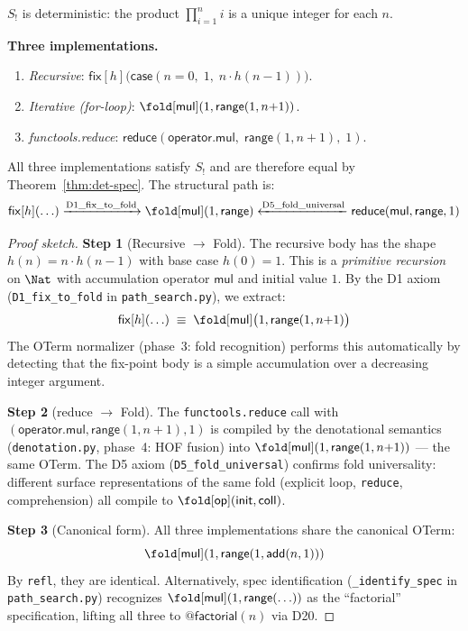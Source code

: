 \begin{proposition}
$S_{!}$ is deterministic: the product $\prod_{i=1}^{n} i$ is a
unique integer for each $n$.
\end{proposition}

\noindent\textbf{Three implementations.}
\begin{enumerate}
  \item \emph{Recursive}:
    $\mathsf{fix}[h]\bigl(\mathsf{case}(n = 0,\; 1,\;
      n \cdot h(n-1))\bigr)$.
  \item \emph{Iterative (for-loop)}:
    $\fold[\mathsf{mul}](1, \mathsf{range}(1, n{+}1))$.
  \item \emph{functools.reduce}:
    $\mathsf{reduce}(\mathsf{operator.mul},\;
      \mathsf{range}(1, n{+}1),\; 1)$.
\end{enumerate}

\begin{theorem}
\label{thm:factorial-equiv}
All three implementations satisfy $S_{!}$ and are therefore
equal by Theorem~\ref{thm:det-spec}.  The structural path is:
\[
  \mathsf{fix}[h](\ldots) \xrightarrow{\text{D1\_fix\_to\_fold}}
  \fold[\mathsf{mul}](1, \mathsf{range})
  \xleftarrow{\text{D5\_fold\_universal}}
  \mathsf{reduce}(\mathsf{mul}, \mathsf{range}, 1)
\]
\end{theorem}

\begin{proof}[Proof sketch]
\textbf{Step 1} (Recursive $\to$ Fold).  The recursive body has the
shape $h(n) = n \cdot h(n-1)$ with base case $h(0) = 1$.  This is a
\emph{primitive recursion} on $\Nat$ with accumulation operator
$\mathsf{mul}$ and initial value $1$.  By the D1 axiom
(\texttt{D1\_fix\_to\_fold} in \texttt{path\_search.py}), we extract:
\[
  \mathsf{fix}[h](\ldots) \;\equiv\;
  \fold[\mathsf{mul}]\bigl(1, \mathsf{range}(1, n{+}1)\bigr)
\]
The OTerm normalizer (phase~3: fold recognition) performs this
automatically by detecting that the fix-point body is a simple
accumulation over a decreasing integer argument.

\textbf{Step 2} (reduce $\to$ Fold).  The \texttt{functools.reduce}
call with $(\mathsf{operator.mul}, \mathsf{range}(1,n{+}1), 1)$
is compiled by the denotational semantics (\texttt{denotation.py},
phase~4: HOF fusion) into $\fold[\mathsf{mul}](1, \mathsf{range}(1,n{+}1))$
--- the same OTerm.  The D5 axiom (\texttt{D5\_fold\_universal})
confirms fold universality: different surface representations of the
same fold (explicit loop, \texttt{reduce}, comprehension) all compile
to $\fold[\mathsf{op}](\mathsf{init}, \mathsf{coll})$.

\textbf{Step 3} (Canonical form).  All three implementations share
the canonical OTerm:
\[
  \fold[\mathsf{mul}](1, \mathsf{range}(1, \mathsf{add}(n, 1)))
\]
By \texttt{refl}, they are identical.  Alternatively, spec
identification (\texttt{\_identify\_spec} in \texttt{path\_search.py})
recognizes $\fold[\mathsf{mul}](1, \mathsf{range}(\ldots))$ as the
``factorial'' specification, lifting all three to
$\mathsf{@factorial}(n)$ via D20.
\end{proof}

